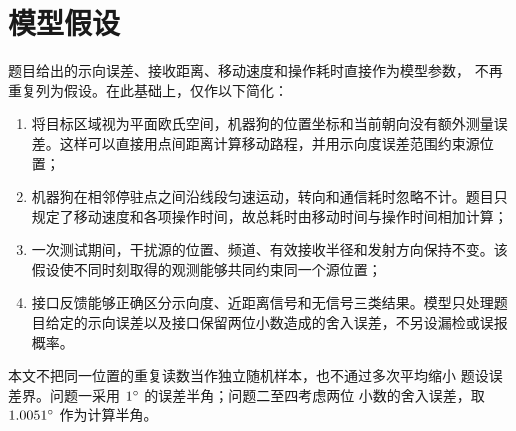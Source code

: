 \section{模型假设}

题目给出的示向误差、接收距离、移动速度和操作耗时直接作为模型参数，
不再重复列为假设。在此基础上，仅作以下简化：

\begin{enumerate}
  \item 将目标区域视为平面欧氏空间，机器狗的位置坐标和当前朝向没有额外测量误差。这样可以直接用点间距离计算移动路程，并用示向度误差范围约束源位置；
  \item 机器狗在相邻停驻点之间沿线段匀速运动，转向和通信耗时忽略不计。题目只规定了移动速度和各项操作时间，故总耗时由移动时间与操作时间相加计算；
  \item 一次测试期间，干扰源的位置、频道、有效接收半径和发射方向保持不变。该假设使不同时刻取得的观测能够共同约束同一个源位置；
  \item 接口反馈能够正确区分示向度、近距离信号和无信号三类结果。模型只处理题目给定的示向误差以及接口保留两位小数造成的舍入误差，不另设漏检或误报概率。
\end{enumerate}

本文不把同一位置的重复读数当作独立随机样本，也不通过多次平均缩小
题设误差界。问题一采用 \(1^{\circ}\) 的误差半角；问题二至四考虑两位
小数的舍入误差，取 \(1.0051^{\circ}\) 作为计算半角。
